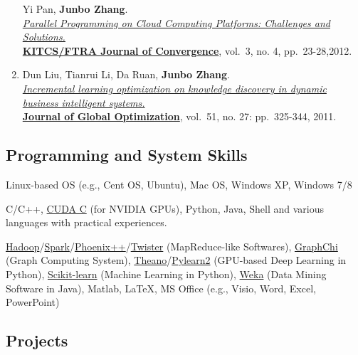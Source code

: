 \documentclass[10pt,a4paper]{article}
\renewenvironment{description}{
  \begin{basedescript}{\desclabelstyle{\pushlabel}\desclabelwidth{8em}}
}{
  \end{basedescript}
}
\begin{document}
\begin{enumerate}
  Yi Pan, \textbf{Junbo Zhang}.\\
  \href{http://www.ftrai.org/xe/index.php?mid=joc_published\&category=37964\&search_keyword=section\&search_target=title\&document_srl=38459}{\emph{Parallel
  Programming on Cloud Computing Platforms: Challenges and
  Solutions.}}\\ \href{http://www.ftrai.org/joc/}{\textbf{KITCS/FTRA
  Journal of Convergence}}, vol.~3, no. 4, pp.~23-28,2012.
\item
  Dun Liu, Tianrui Li, Da Ruan, \textbf{Junbo Zhang}.\\
  \href{http://dx.doi.org/10.1007/s10898-010-9607-8}{\emph{Incremental
  learning optimization on knowledge discovery in dynamic business
  intelligent systems.}}\\
  \href{http://www.springer.com/business+\%26+management/operations+research/journal/10898}{\textbf{Journal
  of Global Optimization}}, vol.~51, no. 27: pp.~325-344, 2011.
\end{enumerate}

\subsection{Programming and System
Skills}\label{programming-and-system-skills}

\begin{description}
\item[Operating System]
Linux-based OS (e.g., Cent OS, Ubuntu), Mac OS, Windows XP, Windows 7/8
\item[Programming]
C/C++, \href{http://www.nvidia.com/object/cuda_home_new.html}{CUDA C}
(for NVIDIA GPUs), Python, Java, Shell and various languages with
practical experiences.
\item[Others]
\href{http://hadoop.apache.org/}{Hadoop}/\href{http://spark.apache.org/}{Spark}/\href{http://mapreduce.stanford.edu/}{Phoenix++}/\href{http://www.iterativemapreduce.org/}{Twister}
(MapReduce-like Softwares), \href{https://github.com/GraphChi}{GraphChi}
(Graph Computing System),
\href{http://deeplearning.net/software/theano/}{Theano}/\href{http://deeplearning.net/software/pylearn2/}{Pylearn2}
(GPU-based Deep Learning in Python),
\href{http://scikit-learn.org/stable/}{Scikit-learn} (Machine Learning
in Python), \href{http://www.cs.waikato.ac.nz/ml/weka/}{Weka} (Data
Mining Software in Java), Matlab, \LaTeX, MS Office (e.g., Visio, Word,
Excel, PowerPoint)
\end{description}

\subsection{Projects}\label{projects}
\end{document}
